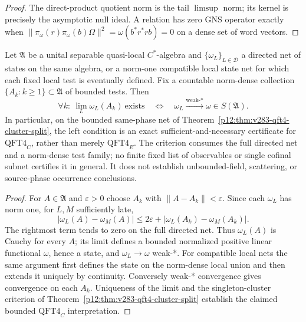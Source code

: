 \documentclass[12pt,a4paper]{article}
\begin{document}
\begin{proof}
The direct-product quotient norm is the tail $\limsup$ norm;
its kernel is precisely the asymptotic null ideal. A relation has
zero GNS operator exactly when $\|\pi_\omega(r)\pi_\omega(b)\Omega\|^2
=\omega(b^*r^*rb)=0$ on a dense set of word vectors.
\end{proof}


\begin{theorem}
\label{p12:thm:v292-dense-local-test-convergence}
Let $\mathfrak A$ be a unital separable quasi-local $C^*$-algebra and
$\{\omega_L\}_{L\in\mathcal D}$ a directed net of states on the same
algebra, or a norm-one compatible local state net for which each fixed
local test is eventually defined.  Fix a countable norm-dense collection
$\{A_k:k\geq1\}\subset\mathfrak A$ of bounded tests.  Then
\[
\boxed{\quad
\forall k:\ \lim_L\omega_L(A_k)\ \text{exists}
\quad\Longleftrightarrow\quad
\omega_L\xrightarrow{\text{weak-*}}\omega\in S(\mathfrak A).
\quad}
\]
In particular, on the bounded same-phase net of
Theorem~\ref{p12:thm:v283-qft4-cluster-split}, the left condition is an
exact sufficient-and-necessary certificate for $\mathrm{QFT4}_C$, rather
than merely $\mathrm{QFT4}_E$.  The criterion consumes the full directed
net and a norm-dense test family; no finite fixed list of observables or
single cofinal subnet certifies it in general.  It does not establish
unbounded-field, scattering, or source-phase occurrence conclusions.
\end{theorem}
\begin{proof}
For $A\in\mathfrak A$ and $\varepsilon>0$ choose $A_k$ with
$\|A-A_k\|<\varepsilon$.  Since each $\omega_L$ has norm one, for
$L,M$ sufficiently late,
\[
 |\omega_L(A)-\omega_M(A)|
 \leq 2\varepsilon+|\omega_L(A_k)-\omega_M(A_k)|.
\]
The rightmost term tends to zero on the full directed net.  Thus
$\omega_L(A)$ is Cauchy for every $A$; its limit defines a bounded
normalized positive linear functional $\omega$, hence a state, and
$\omega_L\to\omega$ weak-*.  For compatible local nets the same argument
first defines the state on the norm-dense local union and then extends it
uniquely by continuity.  Conversely weak-* convergence gives convergence
on each $A_k$.  Uniqueness of the limit and the singleton-cluster
criterion of Theorem~\ref{p12:thm:v283-qft4-cluster-split} establish the
claimed bounded $\mathrm{QFT4}_C$ interpretation.
\end{proof}
\end{document}
